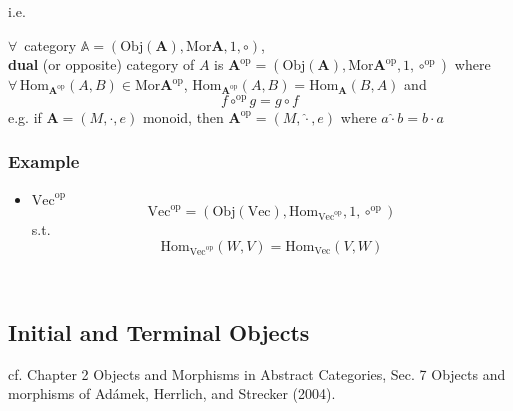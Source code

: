 \documentclass[twoside,landscape,10pt]{amsart}
\theoremstyle{plain}
\theoremstyle{definition}
\theoremstyle{remark}
\begin{document}
\begin{multicols*}{2}
i.e. 

$\forall \, $ category $\mathbb{A} = (\text{Obj}(\mathbf{A}), \text{Mor}\mathbf{A}, 1, \circ)$, \\
\textbf{dual} (or opposite) category of $A$ is $\mathbf{A}^{\text{op}} = (\text{Obj}(\mathbf{A}), \text{Mor}\mathbf{A}^{\text{op}}, 1, \circ^{\text{op}})$ where $\forall \, \text{Hom}_{\mathbf{A}^{\text{op}}}(A,B) \in \text{Mor}\mathbf{A}^{\text{op}}$, $\text{Hom}_{\mathbf{A}^{\text{op}}}(A,B) = \text{Hom}_{\mathbf{A}}(B,A)$ and 
\[
f\circ^{\text{op}}g = g\circ f
\]
e.g. if $\mathbf{A} = (M,\cdot, e)$ monoid, then $\mathbf{A}^{\text{op}} = (M, \widehat{\cdot},e)$ where $a\widehat{\cdot} b = b\cdot a$


\subsubsection{Example}

\begin{itemize}
  \item $\text{Vec}^{\text{op}}$
\[
\text{Vec}^{\text{op}} = (\text{Obj}(\text{Vec}), \text{Hom}_{\text{Vec}^{\text{op}}}, 1, \circ^{\text{op}})
\]
s.t.
\[
\text{Hom}_{\text{Vec}^{\text{op}} }(W,V) = \text{Hom}_{\text{Vec}}(V,W)
\]


 \qquad \, 


\end{itemize}


\subsection{Initial and Terminal Objects}
cf. Chapter 2 Objects and Morphisms in Abstract Categories, Sec. 7 Objects and morphisms of Ad\'{a}mek, Herrlich, and Strecker (2004).  


\end{multicols*}
\end{document}

